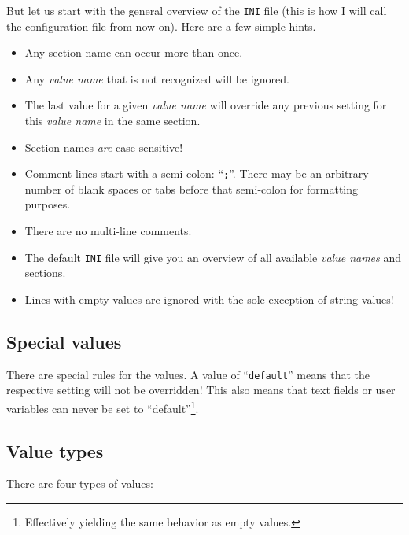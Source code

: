 \documentclass[a4paper,titlepage]{report}
\begin{document}
But let us start with the general overview of the \texttt{INI} file (this is how I will call
the configuration file from now on). Here are a few simple hints.
\begin{itemize}
  \item Any section name can occur more than once.
  \item Any \emph{value name} that is not recognized will be ignored.
  \item The last value for a given \emph{value name} will override any previous setting for this \emph{value name} in the same section.
  \item Section names \emph{are} case-sensitive!
  \item Comment lines start with a semi-colon: ``\verb+;+''. There may be an arbitrary number of blank spaces or tabs before that semi-colon for formatting purposes.
  \item There are no multi-line comments.
  \item The default \texttt{INI} file will give you an overview of all available \emph{value names} and sections.
  \item Lines with empty values are ignored with the sole exception of string values!
\end{itemize}

\subsection{Special values}
There are special rules for the values. A value of ``\texttt{default}'' means that
the respective setting will not be overridden! This also means that text fields or
user variables can never be set to ``default''\footnote{Effectively yielding the
same behavior as empty values.}.

\subsection{Value types}
There are four types of values:
\end{document}
